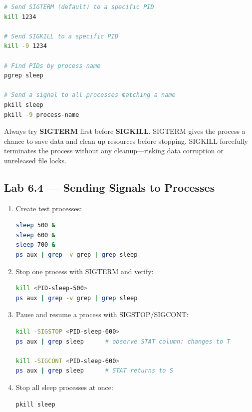 \begin{lstlisting}[language=bash, caption={Using kill, pkill, and pgrep}]
# Send SIGTERM (default) to a specific PID
kill 1234

# Send SIGKILL to a specific PID
kill -9 1234

# Find PIDs by process name
pgrep sleep

# Send a signal to all processes matching a name
pkill sleep
pkill -9 process-name
\end{lstlisting}

\begin{tipbox}
  Always try \textbf{SIGTERM} first before \textbf{SIGKILL}. SIGTERM gives the
  process a chance to save data and clean up resources before stopping.
  SIGKILL forcefully terminates the process without any cleanup---risking data
  corruption or unreleased file locks.
\end{tipbox}

\subsection*{Lab 6.4 --- Sending Signals to Processes}

\begin{enumerate}
  \item Create test processes:
\begin{lstlisting}[language=bash, caption={Creating test processes}]
sleep 500 &
sleep 600 &
sleep 700 &
ps aux | grep -v grep | grep sleep
\end{lstlisting}

  \item Stop one process with SIGTERM and verify:
\begin{lstlisting}[language=bash, caption={Stopping a process with SIGTERM}]
kill <PID-sleep-500>
ps aux | grep -v grep | grep sleep
\end{lstlisting}

  \item Pause and resume a process with SIGSTOP/SIGCONT:
\begin{lstlisting}[language=bash, caption={Pausing and resuming a process}]
kill -SIGSTOP <PID-sleep-600>
ps aux | grep sleep      # observe STAT column: changes to T

kill -SIGCONT <PID-sleep-600>
ps aux | grep sleep      # STAT returns to S
\end{lstlisting}

  \item Stop all sleep processes at once:
\begin{lstlisting}[language=bash, caption={Stopping all sleep processes}]
pkill sleep
\end{lstlisting}
\end{enumerate}

